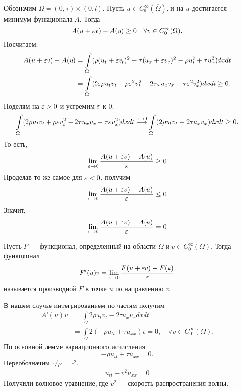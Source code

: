 Обозначим $\Omega = (0, \tau) \times (0, l)$.
Пусть $u \in C^{\infty}_0(\overline{\Omega})$, и на $u$ достигается минимум функционала $A$. Тогда 
$$A(u + \varepsilon v) - A(u) \geq 0\quad \forall v \in C^{\infty}_0(\Omega).$$
Посчитаем:
\begin{align*}
A(u + \varepsilon v) - A(u) & =  \int \limits_{\Omega} (\rho(u_t + \varepsilon v_t)^2 - \tau(u_x + \varepsilon v_x)^2 - \rho u_t^2 + \tau u_x^2 ) dxdt \\
 & = \int \limits_{\Omega} (2 \varepsilon \rho u_t v_t + \rho \varepsilon^2 v_t^2 - 2 \tau \varepsilon u_x v_x - \tau \varepsilon^2 v_x^2 ) dxdt \geq 0 .
\end{align*}
Поделим на $\varepsilon > 0$ и устремим $\varepsilon$ к $0$:
$$ \int \limits_{\Omega} (2 \rho u_t v_t + \rho \varepsilon v_t^2 - 2 \tau u_x v_x - \tau \varepsilon v_x^2 ) dxdt \stackrel{\varepsilon \to 0} \longrightarrow \int \limits_{\Omega} (2 \rho u_t v_t - 2 \tau u_x v_x) dxdt \geq 0 .$$
То есть,
$$ \lim \limits_{\varepsilon \to 0} \frac {A(u + \varepsilon v) - A(u)} {\varepsilon} \geq 0$$
Проделав то же самое для $\varepsilon < 0$, получим
$$ \lim \limits_{\varepsilon \to 0} \frac {A(u + \varepsilon v) - A(u)} {\varepsilon} \leq 0$$
Значит, $$ \lim \limits_{\varepsilon \to 0} \frac {A(u + \varepsilon v) - A(u)} {\varepsilon} = 0$$

\begin{definition} Пусть $F$ --- функционал, определенный на области $\Omega$ и $v \in C^{\infty}_0(\Omega)$. Тогда функционал 
$$ F'(u)v = \lim \limits_{\varepsilon \to 0} \frac {F(u + \varepsilon v) - F(u)} {\varepsilon}$$
называется производной $F$ в точке $u$ по направлению $v$.
\end{definition}

В нашем случае интегрированием по частям получим
\begin{align*}
A'(u)v &  = \int \limits_{\Omega} 2 \rho u_t v_t - 2 \tau u_x v_x dx dt \\
       &  = \int \limits_{\Omega} 2 (-\rho u_{tt} + \tau u_{xx}) v = 0,\quad \forall v \in C^{\infty}_0 (\Omega).
\end{align*}
По основной лемме вариационного исчисления 
$$ -\rho u_{tt} + \tau u_{xx} = 0 .$$
Переобозначим $\tau / \rho = v^2 $:
\begin{align}
    u_{tt} - v^2 u_{xx} = 0
\label{waveequation}
\end{align}
Получили волновое уравнение, где $v^2$ --- скорость распространения волны.